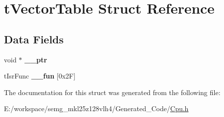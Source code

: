 \hypertarget{structt_vector_table}{\section{t\-Vector\-Table Struct Reference}
\label{structt_vector_table}
}
\subsection*{Data Fields}
\begin{DoxyCompactItemize}
\item 
\hypertarget{structt_vector_table_a324d365e9c8c6c033f4edbc906f94844}{void $\ast$ {\bfseries \-\_\-\-\_\-ptr}}\label{structt_vector_table_a324d365e9c8c6c033f4edbc906f94844}

\item 
\hypertarget{structt_vector_table_aeef9a059db36607f5d6f00cfc5a50f4e}{t\-Isr\-Func {\bfseries \-\_\-\-\_\-fun} \mbox{[}0x2\-F\mbox{]}}\label{structt_vector_table_aeef9a059db36607f5d6f00cfc5a50f4e}

\end{DoxyCompactItemize}


The documentation for this struct was generated from the following file\-:\begin{DoxyCompactItemize}
\item 
E\-:/workspace/semg\-\_\-mkl25z128vlh4/\-Generated\-\_\-\-Code/\hyperlink{_cpu_8h}{Cpu.\-h}\end{DoxyCompactItemize}
